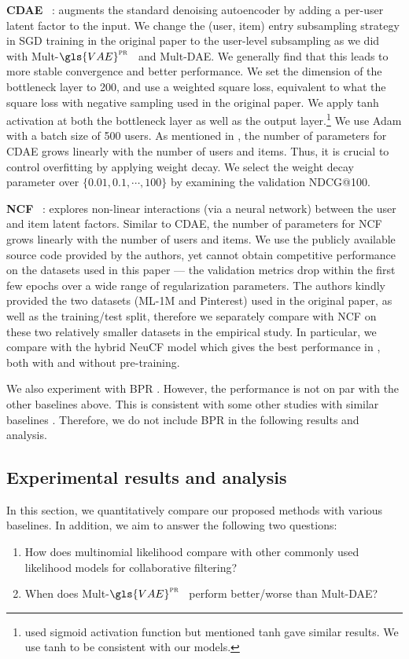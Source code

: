 \documentclass[sigconf]{acmart}
\DeclareRobustCommand{\parhead}[1]{\textbf{#1}~}
\newcommand{\mvae}{{\small Mult-}$\gls{VAE}^{\text{\sc pr}}$}
\newcommand{\mdae}{{\small Mult-}\gls{DAE}}
\begin{document}
\parhead{\Gls{CDAE}} \citep{wu2016collaborative}: augments the standard denoising autoencoder by adding a per-user latent factor to the input. We change the (user, item) entry subsampling strategy in SGD training in the original paper to the user-level subsampling as we did with \mvae~ and \mdae. We generally find that this leads to more stable convergence and better performance. We set the dimension of the bottleneck layer to 200, and use a weighted square loss, equivalent to what the square loss with negative sampling used in the original paper. We apply tanh activation at both the bottleneck layer as well as the output layer.\footnote{\citet{wu2016collaborative} used sigmoid activation function but mentioned tanh gave similar results. We use tanh to be consistent with our models.} We use Adam with a batch size of 500 users. As mentioned in , the number of parameters for \gls{CDAE} grows linearly with the number of users and items. Thus, it is crucial to control overfitting by applying weight decay. We select the weight decay parameter over $\{0.01, 0.1, \cdots, 100\}$ by examining the validation NDCG@100. 

\parhead{\Gls{NCF}} \citep{he2017neural}: explores non-linear interactions (via a neural network) between the user and item latent factors. Similar to \gls{CDAE}, the number of parameters for \gls{NCF} grows linearly with the number of users and items. We use the publicly available source code provided by the authors, yet cannot obtain competitive performance on the datasets used in this paper --- the validation metrics drop within the first few epochs over a wide range of regularization parameters. The authors kindly provided the two datasets (ML-1M and Pinterest) used in the original paper, as well as the training/test split, therefore we separately compare with \gls{NCF} on these two relatively smaller datasets in the empirical study. In particular, we compare with the hybrid NeuCF model which gives the best performance in \citet{he2017neural}, both with and without pre-training.

We also experiment with \gls{BPR} \citep{rendle2009bpr}. However, the performance is not on par with the other baselines above. This is consistent with some other studies with similar baselines \citep{sedhain2016effectiveness}. Therefore, we do not include \gls{BPR} in the following results and analysis. 

\subsection{Experimental results and analysis}
In this section, we quantitatively compare our proposed methods with various baselines. In addition, we aim to answer the following two questions:
\begin{enumerate}
	\item How does multinomial likelihood compare with other commonly used likelihood models for collaborative filtering?
	\item When does \mvae~ perform better/worse than \mdae?
\end{enumerate}
\end{document}
